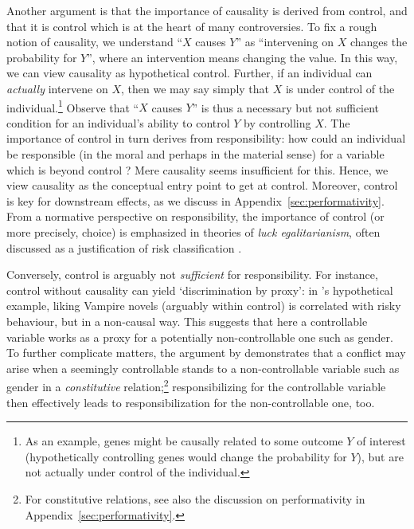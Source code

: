 \documentclass[11pt]{article} %
\begin{document}
Another argument is that the importance of causality is derived from control, and that it is control which is at the heart of many controversies. To fix a rough notion of causality, we understand ``$X$ causes $Y$'' as ``intervening on $X$ changes the probability for $Y$'', where an intervention means changing the value. In this way, we can view causality as hypothetical control. Further, if an individual can \textit{actually} intervene on $X$, then we may say simply that $X$ is under control of the individual.\footnote{As an example, genes might be causally related to some outcome $Y$ of interest (hypothetically controlling genes would change the probability for $Y$), but are not actually under control of the individual.} Observe that ``$X$ causes $Y$'' is thus a necessary but not sufficient condition for an individual's ability to control $Y$ by controlling $X$.
The importance of control in turn derives from responsibility: how could an individual be responsible (in the moral and perhaps in the material sense) for a variable which is beyond control \citep{abraham1985efficiency,avraham2017discrimination}? Mere causality seems insufficient for this. Hence, we view causality as the conceptual entry point to get at control. Moreover, control is key for downstream effects, as we discuss in Appendix~\ref{sec:performativity}. From a normative perspective on responsibility, the importance of control (or more precisely, choice) is emphasized in theories of \textit{luck egalitarianism}, often discussed as a justification of risk classification \citep{knight2013luck,lippert2015genetic,huseby2016can,bjork2020better}.

Conversely, control is arguably not \textit{sufficient} for responsibility. %
For instance, control without causality can yield `discrimination by proxy': in \citeauthor{swedloff2014risk}'s \citeyearpar{swedloff2014risk} hypothetical example, liking Vampire novels (arguably within control) is correlated with risky behaviour, but in a non-causal way. This suggests that here a controllable variable works as a proxy for a potentially non-controllable one such as gender. To further complicate matters, the argument by \citet{hu2020s} demonstrates that a conflict may arise when a seemingly controllable stands to a non-controllable variable such as gender in a \textit{constitutive} relation;\footnote{For constitutive relations, see also the discussion on performativity in Appendix~\ref{sec:performativity}.} responsibilizing for the controllable variable then effectively leads to responsibilization for the non-controllable one, too.
\end{document}
